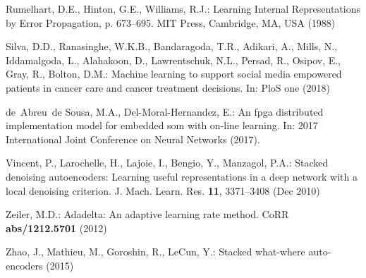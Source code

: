 \documentclass[runningheads]{llncs}
\begin{document}
\begin{thebibliography}{10}
Rumelhart, D.E., Hinton, G.E., Williams, R.J.: Learning Internal
  Representations by Error Propagation, p. 673–695. MIT Press, Cambridge, MA,
  USA (1988)

Silva, D.D., Ranasinghe, W.K.B., Bandaragoda, T.R., Adikari, A., Mills, N.,
  Iddamalgoda, L., Alahakoon, D., Lawrentschuk, N.L., Persad, R., Osipov, E.,
  Gray, R., Bolton, D.M.: Machine learning to support social media empowered
  patients in cancer care and cancer treatment decisions. In: PloS one (2018)

de~Abreu~de Sousa, M.A., Del-Moral-Hernandez, E.: An fpga distributed
  implementation model for embedded som with on-line learning. In: 2017
  International Joint Conference on Neural Networks (2017).

Vincent, P., Larochelle, H., Lajoie, I., Bengio, Y., Manzagol, P.A.: Stacked
  denoising autoencoders: Learning useful representations in a deep network
  with a local denoising criterion. J. Mach. Learn. Res.  \textbf{11},
  3371–3408 (Dec 2010)

Zeiler, M.D.: Adadelta: An adaptive learning rate method. CoRR
  \textbf{abs/1212.5701} (2012)

Zhao, J., Mathieu, M., Goroshin, R., LeCun, Y.: Stacked what-where
  auto-encoders (2015)

\end{thebibliography}
\end{document}
